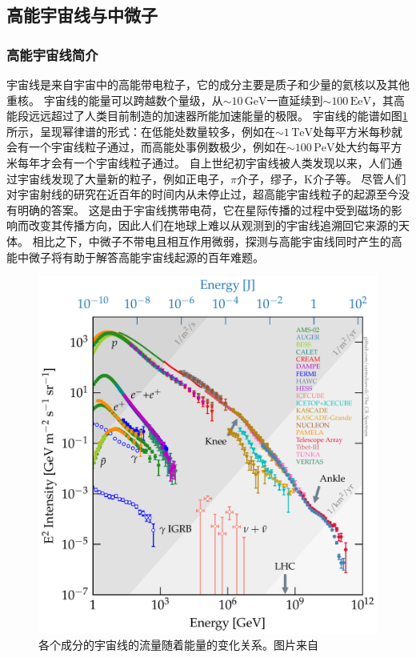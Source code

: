 \subsection{高能宇宙线与中微子}

\subsubsection{高能宇宙线简介}

宇宙线是来自宇宙中的高能带电粒子，它的成分主要是质子和少量的氦核以及其他重核\cite{Gaisser:2016}。
宇宙线的能量可以跨越数个量级，从$\sim 10 \,\mathrm{GeV}$一直延续到$\sim 100 \,\mathrm{EeV}$，其高能段远远超过了人类目前制造的加速器所能加速能量的极限。
宇宙线的能谱如图\ref{fig:CR_spectrum}所示，呈现幂律谱的形式：在低能处数量较多，例如在$\sim 1 \,\mathrm{TeV}$处每平方米每秒就会有一个宇宙线粒子通过，而高能处事例数极少，例如在$\sim 100 \,\mathrm{PeV}$处大约每平方米每年才会有一个宇宙线粒子通过。
自上世纪初宇宙线被人类发现以来，人们通过宇宙线发现了大量新的粒子，例如正电子，$\pi$介子，缪子，K介子等。
尽管人们对宇宙射线的研究在近百年的时间内从未停止过，超高能宇宙线粒子的起源至今没有明确的答案。
这是由于宇宙线携带电荷，它在星际传播的过程中受到磁场的影响而改变其传播方向，因此人们在地球上难以从观测到的宇宙线追溯回它来源的天体。
相比之下，中微子不带电且相互作用微弱，探测与高能宇宙线同时产生的高能中微子将有助于解答高能宇宙线起源的百年难题。

\begin{figure}[htb]
    \centering
    \includegraphics[width=0.8\linewidth]{img/cosmic_ray_spectrum.pdf}
    \caption{各个成分的宇宙线的流量随着能量的变化关系。图片来自\parencite{CR_spectrum:2022}}
    \label{fig:CR_spectrum}
\end{figure}

